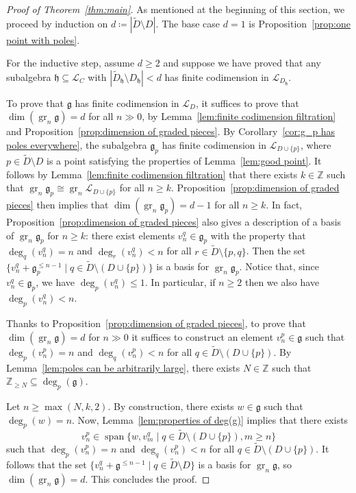 \documentclass[12pt]{amsart}
\theoremstyle{plain}
\theoremstyle{definition}
\numberwithin{equation}{section}
\def\g{\mathfrak{g}}
\def\h{\mathfrak{h}}
\def\L{\mathcal{L}}
\def\ZZ{\mathbb{Z}}
\DeclareMathOperator{\spn}{span}
\DeclareMathOperator{\gr}{gr}
\begin{document}
\begin{proof}[Proof of Theorem~\ref{thm:main}]
    As mentioned at the beginning of this section, we proceed by induction on $d \coloneqq |\widetilde{D} \setminus D|$. The base case $d = 1$ is Proposition~\ref{prop:one point with poles}.
    
    For the inductive step, assume $d \geq 2$ and suppose we have proved that any subalgebra $\h \subseteq \L_C$ with $|\widetilde{D}_\h \setminus D_\h| < d$ has finite codimension in $\L_{D_\h}$.

    To prove that $\g$ has finite codimension in $\L_D$, it suffices to prove that $\dim(\gr_n \g) = d$ for all $n \gg 0$, by Lemma~\ref{lem:finite codimension filtration} and Proposition~\ref{prop:dimension of graded pieces}. By Corollary~\ref{cor:g_p has poles everywhere}, the subalgebra $\g_p$ has finite codimension in $\L_{D \cup \{p\}}$, where $p \in \widetilde{D} \setminus D$ is a point satisfying the properties of Lemma~\ref{lem:good point}. It follows by Lemma~\ref{lem:finite codimension filtration} that there exists $k \in \ZZ$ such that $\gr_n \g_p \cong \gr_n \L_{D \cup \{p\}}$ for all $n \geq k$. Proposition~\ref{prop:dimension of graded pieces} then implies that $\dim(\gr_n \g_p) = d - 1$ for all $n \geq k$. In fact, Proposition~\ref{prop:dimension of graded pieces} also gives a description of a basis of $\gr_n \g_p$ for $n \geq k$: there exist elements $v_n^q \in \g_p$ with the property that $\deg_q(v_n^q) = n$ and $\deg_r(v_n^q) < n$ for all $r \in \widetilde{D} \setminus \{p,q\}$. Then the set $\{v_n^q + \g_p^{\leq n - 1} \mid q \in \widetilde{D} \setminus (D \cup \{p\})\}$ is a basis for $\gr_n \g_p$. Notice that, since $v_n^q \in \g_p$, we have $\deg_p(v_n^q) \leq 1$. In particular, if $n \geq 2$ then we also have $\deg_p(v_n^q) < n$.
    
    Thanks to Proposition~\ref{prop:dimension of graded pieces}, to prove that $\dim(\gr_n \g) = d$ for $n \gg 0$ it suffices to construct an element $v_n^p \in \g$ such that $\deg_p(v_n^p) = n$ and $\deg_q(v_n^p) < n$ for all $q \in \widetilde{D} \setminus (D \cup \{p\})$. By Lemma~\ref{lem:poles can be arbitrarily large}, there exists $N \in \ZZ$ such that $\ZZ_{\geq N} \subseteq \deg_p(\g)$.
    
    Let $n \geq \max(N,k,2)$. By construction, there exists $w \in \g$ such that $\deg_p(w) = n$. Now, Lemma~\ref{lem:properties of deg(g)} implies that there exists
    $$v_n^p \in \spn\{w,v_m^q \mid q \in \widetilde{D} \setminus (D \cup \{p\}), m \geq n\}$$
    such that $\deg_p(v_n^p) = n$ and $\deg_q(v_n^p) < n$ for all $q \in \widetilde{D} \setminus (D \cup \{p\})$. It follows that the set $\{v_n^q + \g^{\leq n - 1} \mid q \in \widetilde{D} \setminus D\}$ is a basis for $\gr_n \g$, so $\dim(\gr_n \g) = d$. This concludes the proof.
\end{proof}
\end{document}
